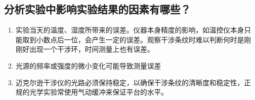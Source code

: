 \documentclass[a4paper,utf8]{article}
\begin{document}
    \subsection{分析实验中影响实验结果的因素有哪些？} 
    \begin{enumerate}
        \item 实验当天的温度、湿度所带来的误差。仪器本身精度的影响，如温控仪本身只能取到小数点后一位，会产生一定的误差。观察干涉条纹时难以判断何时是刚刚好出现一个干涉环，时间测量上也有误差。
        \item 光源的频率或强度的微小变化可能导致测量误差
        \item 迈克尔逊干涉仪的光路必须保持稳定，以确保干涉条纹的清晰度和稳定性，正规的光学实验常使用气动缓冲来保证平台的水平。
    \end{enumerate}
\end{document}
